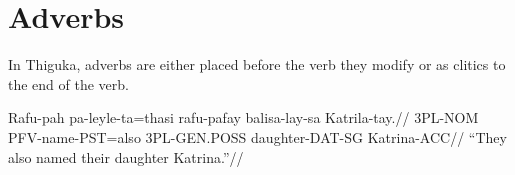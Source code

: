 \section{Adverbs}
In Thiguka, adverbs are either placed before the verb they modify or as clitics to the end of the verb.

\ex
\begingl
\gla   Rafu-pah pa-leyle-ta=thasi rafu-pafay   balisa-lay-sa   Katrila-tay.//
\glb   3PL-NOM  PFV-name-PST=also 3PL-GEN.POSS daughter-DAT-SG Katrina-ACC//
\glft  ``They also named their daughter Katrina.''//
\endgl
\xe
